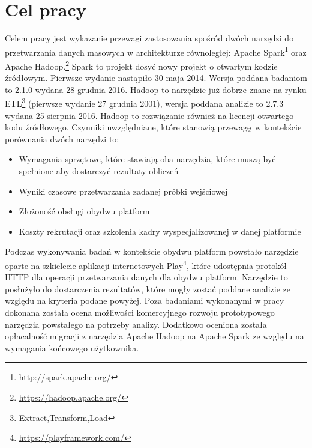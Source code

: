 \section{Cel pracy}
Celem pracy jest wykazanie przewagi zastosowania spośród dwóch narzędzi do przetwarzania danych masowych w architekturze równoległej: Apache Spark\footnote{\url{http://spark.apache.org/}} oraz Apache Hadoop.\footnote{\url{https://hadoop.apache.org/}} Spark to projekt dosyć nowy projekt o otwartym kodzie źródłowym. Pierwsze wydanie nastąpiło 30 maja 2014. Wersja poddana badaniom to 2.1.0 wydana 28 grudnia 2016. Hadoop to narzędzie już dobrze znane na rynku ETL\footnote{Extract,Transform,Load} (pierwsze wydanie 27 grudnia 2001), wersja poddana analizie to 2.7.3 wydana 25 sierpnia 2016. Hadoop to rozwiązanie również na licencji otwartego kodu źródłowego. Czynniki uwzględniane, które stanowią przewagę w kontekście porównania dwóch narzędzi to:
\begin{itemize}
	\item Wymagania sprzętowe, które stawiają oba narzędzia, które muszą być spełnione aby dostarczyć rezultaty obliczeń
	\item Wyniki czasowe przetwarzania zadanej próbki wejściowej
	\item Złożoność obsługi obydwu platform
	\item Koszty rekrutacji oraz szkolenia kadry wyspecjalizowanej w danej platformie
\end{itemize}
Podczas wykonywania badań w kontekście obydwu platform powstało narzędzie oparte na szkielecie aplikacji internetowych Play\footnote{\url{https://playframework.com/}}, które udostępnia protokół HTTP dla operacji przetwarzania danych dla obydwu platform. Narzędzie to posłużyło do dostarczenia rezultatów, które mogły zostać poddane analizie ze względu na kryteria podane powyżej. Poza badaniami wykonanymi w pracy dokonana została ocena możliwości komercyjnego rozwoju prototypowego narzędzia powstałego na potrzeby analizy. Dodatkowo oceniona została opłacalność migracji z narzędzia Apache Hadoop na Apache Spark ze względu na wymagania końcowego użytkownika.
